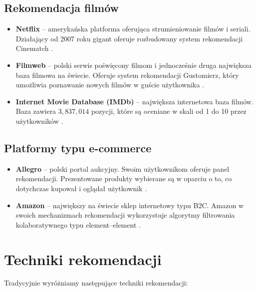 \documentclass[twoside]{iisthesis}
\begin{document}
	 \subsection{Rekomendacja filmów}
	 \begin{itemize}
	 	\item \textbf{Netflix} -- amerykańska platforma oferująca strumieniowanie filmów i seriali. Działający od 2007 roku gigant oferuje rozbudowany system rekomendacji Cinematch \cite{id:aStreamOfMovies}. 
	 	\item \textbf{Filmweb} -- polski serwis poświęcony filmom i jednocześnie druga największa baza filmowa na świecie. Oferuje system rekomendacji Gustomierz, który umożliwia poznawanie nowych filmów w guście użytkownika \cite{id:filmwebfaq}.
	 	\item \textbf{Internet Movie Database (IMDb)} -- największa internetowa baza filmów. Baza zawiera $3,837,014$ pozycji, które są oceniane w skali od 1 do 10 przez użytkowników \cite{id:imdbstats}.
	 \end{itemize}
	 
	 \subsection{Platformy typu e-commerce}
	 
	 \begin{itemize}
	 	\item \textbf{Allegro} -- polski portal aukcyjny. Swoim użytkownikom oferuje panel rekomendacji. Prezentowane produkty wybierane są w oparciu o to, co dotychczas kupował i oglądał użytkownik \cite{id:allegrofaq}. 
	 	\item \textbf{Amazon} -- największy na świecie sklep internetowy typu B2C. Amazon w swoich mechanizmach rekomendacji wykorzystuje algorytmy filtrowania kolaboratywnego typu element--element \cite{id:linden2003amazon}.
	 \end{itemize}	 
	 
	 
	 
	 \section{Techniki rekomendacji}
 
	 Tradycyjnie wyróżniamy następujące techniki rekomendacji: 
	 
\end{document}
